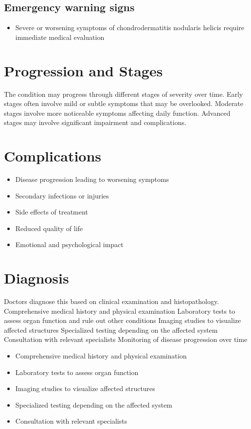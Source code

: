 \subsection{Emergency warning signs}
\begin{itemize}[noitemsep]
  \item Severe or worsening symptoms of chondrodermatitis nodularis helicis require immediate medical evaluation
\end{itemize}
\section{Progression and Stages}
The condition may progress through different stages of severity over time. Early stages often involve mild or subtle symptoms that may be overlooked. Moderate stages involve more noticeable symptoms affecting daily function. Advanced stages may involve significant impairment and complications.
\section{Complications}
\begin{itemize}[noitemsep]
  \item Disease progression leading to worsening symptoms
  \item Secondary infections or injuries
  \item Side effects of treatment
  \item Reduced quality of life
  \item Emotional and psychological impact
\end{itemize}
\section{Diagnosis}
Doctors diagnose this based on clinical examination and histopathology. Comprehensive medical history and physical examination Laboratory tests to assess organ function and rule out other conditions Imaging studies to visualize affected structures Specialized testing depending on the affected system Consultation with relevant specialists Monitoring of disease progression over time

\begin{itemize}[noitemsep]
  \item Comprehensive medical history and physical examination
  \item Laboratory tests to assess organ function
  \item Imaging studies to visualize affected structures
  \item Specialized testing depending on the affected system
  \item Consultation with relevant specialists
\end{itemize}
